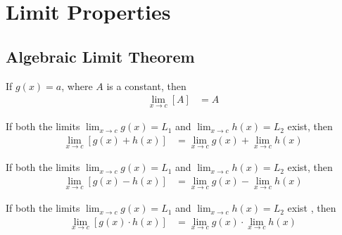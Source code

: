 \documentclass[20150903-160354-rs2.2-MarksMathNotebook.tex]{subfiles}
\begin{document}
%
%

\chapter{Limit Properties}

\section{Algebraic Limit Theorem}

\begin{arule}
If $g(x)=a$, where $A$ is a constant, then
\begin{align}
	\displaystyle \lim_{x \to c} \left[ A \right] &= A \label{eq:altc}
\end{align}
\end{arule}

\begin{arule}
If both the limits $\displaystyle \lim_{x \to c} g(x)=L_1$ and $\displaystyle \lim_{x \to c} h(x)=L_2$ exist, then
\begin{align}
	\displaystyle \lim_{x \to c} \left[ g(x)+h(x) \right] &= \displaystyle \lim_{x \to c} g(x)+ \displaystyle \lim_{x \to c} h(x) \label{eq:alts} 
\end{align}
\end{arule}

\begin{arule}
If both the limits $\displaystyle \lim_{x \to c} g(x)=L_1$ and $\displaystyle \lim_{x \to c} h(x)=L_2$ exist, then
\begin{align}
	\displaystyle \lim_{x \to c} \left[ g(x)-h(x) \right] &= \displaystyle \lim_{x \to c} g(x)- \displaystyle \lim_{x \to c} h(x) \label{eq:alts} 
\end{align}
\end{arule}

\begin{arule}
If both the limits $\displaystyle \lim_{x \to c} g(x)=L_1$ and $\displaystyle \lim_{x \to c} h(x)=L_2$ exist , then
\begin{align}
	\displaystyle \lim_{x \to c} \left[ g(x) \cdot h(x) \right] &= \displaystyle \lim_{x \to c} g(x) \cdot \displaystyle \lim_{x \to c} h(x) \label{eq:altpr} 
\end{align}
\end{arule}
\end{document}
